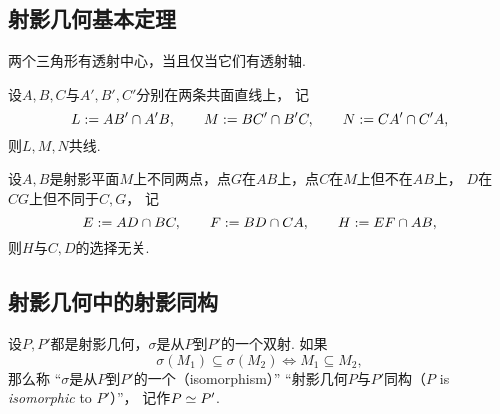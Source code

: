 
\subsection{射影几何基本定理}
\begin{theorem}\label{theorem:射影几何基本定理.德萨格定理}
两个三角形有透射中心，当且仅当它们有透射轴.
\end{theorem}

\begin{theorem}\label{theorem:射影几何基本定理.帕普斯六边形定理}
设\(A,B,C\)与\(A',B',C'\)分别在两条共面直线上，
记\begin{equation*}
	L := AB' \cap A'B,
	\qquad
	M := BC' \cap B'C,
	\qquad
	N := CA' \cap C'A,
\end{equation*}
则\(L,M,N\)共线.
\end{theorem}

\begin{theorem}\label{theorem:射影几何基本定理.帕普斯调和定理}
设\(A,B\)是射影平面\(M\)上不同两点，点\(G\)在\(AB\)上，点\(C\)在\(M\)上但不在\(AB\)上，
\(D\)在\(CG\)上但不同于\(C,G\)，
记\begin{equation*}
	E := AD \cap BC,
	\qquad
	F := BD \cap CA,
	\qquad
	H := EF \cap AB,
\end{equation*}
则\(H\)与\(C,D\)的选择无关.
\end{theorem}

\subsection{射影几何中的射影同构}
\begin{definition}
设\(P,P'\)都是射影几何，\(\sigma\)是从\(P\)到\(P'\)的一个双射.
如果\begin{equation*}
	\sigma(M_1) \subseteq \sigma(M_2)
	\iff
	M_1 \subseteq M_2,
\end{equation*}
那么称
“\(\sigma\)是从\(P\)到\(P'\)的一个（isomorphism）”
“射影几何\(P\)与\(P'\)同构（\(P\) is \emph{isomorphic} to \(P'\)）”，
记作\(P \simeq P'\).
\end{definition}

